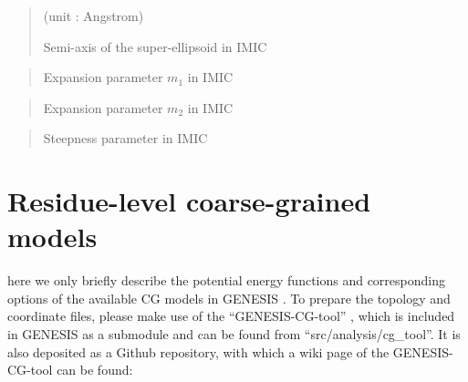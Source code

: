 \documentclass[a4paper,11pt,oneside,english]{sphinxmanual}
\begin{document}
 
\begin{quote}

 (unit : Angstrom)

Semi-axis  of the super-ellipsoid in IMIC
\end{quote}

 
\begin{quote}


Expansion parameter \(m_1\) in IMIC
\end{quote}

 
\begin{quote}


Expansion parameter \(m_2\) in IMIC
\end{quote}

 
\begin{quote}


Steepness parameter  in IMIC
\end{quote}


\section{Residue-level coarse-grained models}
\label{\detokenize{05_Energy:residue-level-coarse-grained-models}}
 here we only briefly describe the potential energy functions and
corresponding options of the available CG models in
GENESIS .  To prepare the topology and coordinate files,
please make use of the “GENESIS-CG-tool” , which is
included in GENESIS as a submodule and can be found from
“src/analysis/cg\_tool”.  It is also deposited as a Github repository, with
which a wiki page of the GENESIS-CG-tool can be found:
\end{document}
